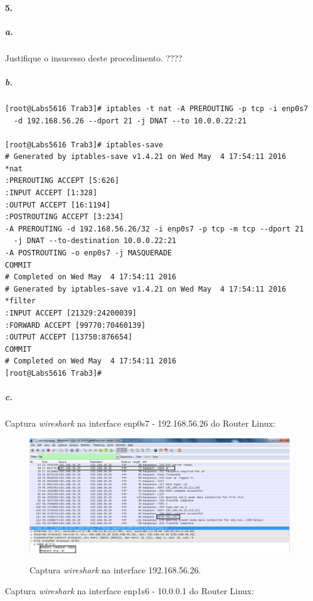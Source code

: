\newpage

\paragraph{5.}

\subparagraph{a.}

Justifique o insucesso deste procedimento. ????


\subparagraph{b.}
\begin{verbatim}
[root@Labs5616 Trab3]# iptables -t nat -A PREROUTING -p tcp -i enp0s7 
  -d 192.168.56.26 --dport 21 -j DNAT --to 10.0.0.22:21

[root@Labs5616 Trab3]# iptables-save
# Generated by iptables-save v1.4.21 on Wed May  4 17:54:11 2016
*nat
:PREROUTING ACCEPT [5:626]
:INPUT ACCEPT [1:328]
:OUTPUT ACCEPT [16:1194]
:POSTROUTING ACCEPT [3:234]
-A PREROUTING -d 192.168.56.26/32 -i enp0s7 -p tcp -m tcp --dport 21 
  -j DNAT --to-destination 10.0.0.22:21
-A POSTROUTING -o enp0s7 -j MASQUERADE
COMMIT
# Completed on Wed May  4 17:54:11 2016
# Generated by iptables-save v1.4.21 on Wed May  4 17:54:11 2016
*filter
:INPUT ACCEPT [21329:24200039]
:FORWARD ACCEPT [99770:70460139]
:OUTPUT ACCEPT [13750:876654]
COMMIT
# Completed on Wed May  4 17:54:11 2016
[root@Labs5616 Trab3]# 
\end{verbatim}


\subparagraph{c.}
Captura \emph{wireshark} na interface \textsf{enp0s7 - 192.168.56.26} do \textsf{Router Linux}:

\begin{figure}[h]
\centering
\includegraphics[width=1\textwidth, height=0.3\textheight]{5_b-enp0s7.png}
\label{fig:enp0s7}
\caption{Captura \emph{wireshark} na interface \textsf{192.168.56.26}.}
\end{figure}

Captura \emph{wireshark} na interface \textsf{enp1s6 - 10.0.0.1} do \textsf{Router Linux}:

